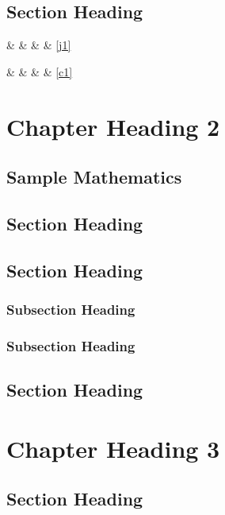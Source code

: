 \documentclass{article}
\begin{document}
\section{Section Heading}
\lipsum[11-12]


 \&  \&  \& \pageref{j1} \& \ref{j1}

 \&  \&   \& \pageref{c1} \& \ref{c1} 


\chapter{Chapter Heading 2}
\section{Sample Mathematics}



\section{Section Heading}
\lipsum[1-4]
\section{Section Heading}
\lipsum[5-6]
\subsection{Subsection Heading}
\lipsum[7-8]
\subsection{Subsection Heading}
\lipsum[9-10]
\section{Section Heading}
\lipsum[11-12]

\chapter[Short Chapter Heading]{Chapter Heading 3}
\section{Section Heading}
\lipsum[1-4]
\end{document}
